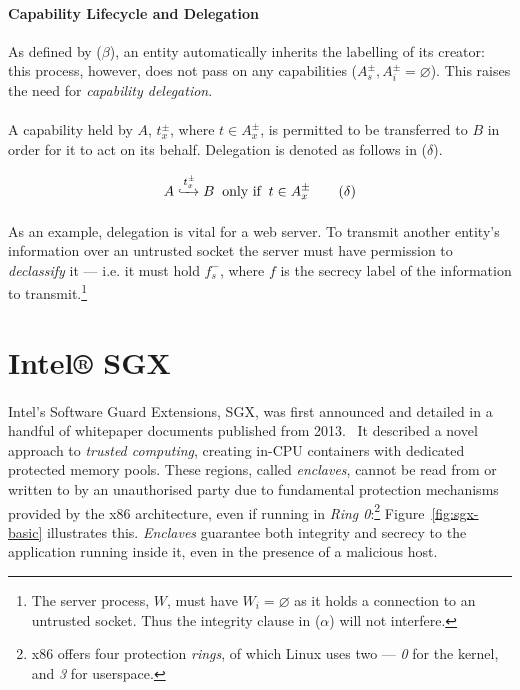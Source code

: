 \paragraph{Capability Lifecycle and Delegation} As defined by ($\beta$), an entity automatically inherits the labelling of its creator: this process, however, does not pass on any capabilities ($A_{s}^{\pm}, A_{i}^{\pm} = \varnothing$). This raises the need for \textit{capability delegation}.

\paragraph{} A capability held by $A$, $t_{x}^{\pm}$, where $t \in A_{x}^{\pm}$, is permitted to be transferred to $B$ in order for it to act on its behalf. Delegation is denoted as follows in ($\delta$).


\begin{equation}
    A \xhookrightarrow[]{t^{\pm}_{x}} B \;\; \text{only if} \;\; t \in A_{x}^{\pm} \tag{$\delta$}
\end{equation}

\paragraph{} As an example, delegation is vital for a web server. To transmit another entity's information over an untrusted socket the server must have permission to \textit{declassify} it --- i.e. it must hold $f_{s}^{-}$, where $f$ is the secrecy label of the information to transmit.\footnote{The server process, $W$, must have $W_{i} = \varnothing$ as it holds a connection to an untrusted socket. Thus the integrity clause in ($\alpha$) will not interfere.}



\section{Intel® SGX}

\paragraph{} Intel's Software Guard Extensions, SGX, was first announced and detailed in a handful of whitepaper documents published from 2013.~\cite{10.1145/2487726.2488370, 10.1145/2487726.2488368, Anati2013InnovativeTF, sgx-sgx-reference} It described a novel approach to \textit{trusted computing}, creating in-CPU containers with dedicated protected memory pools. These regions, called \textit{enclaves}, cannot be read from or written to by an unauthorised party due to fundamental protection mechanisms provided by the x86 architecture, even if running in \textit{Ring 0}:\footnote{x86 offers four protection \textit{rings}, of which Linux uses two --- \textit{0} for the kernel, and \textit{3} for userspace.} Figure~\ref{fig:sgx-basic} illustrates this. \textit{Enclaves} guarantee both integrity and secrecy to the application running inside it, even in the presence of a malicious host.

